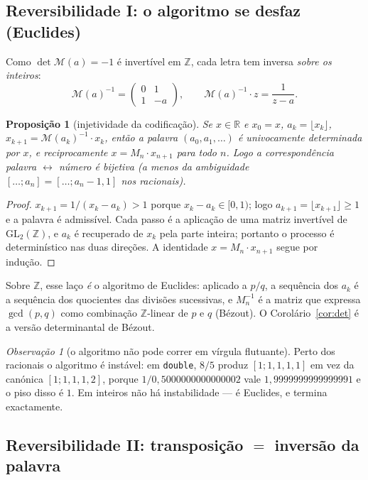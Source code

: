 \documentclass[11pt,a4paper]{article}
\theoremstyle{plain}
\newtheorem{proposicao}[teorema]{Proposição}
\theoremstyle{definition}
\theoremstyle{remark}
\newtheorem{obs}[teorema]{Observação}
\newcommand{\R}{\mathbb{R}}
\newcommand{\Z}{\mathbb{Z}}
\newcommand{\Mat}[1]{\mathcal{M}(#1)}
\newcommand{\GL}{\mathrm{GL}}
\newcommand{\cf}[2]{[#1;#2]}
\begin{document}
\subsection{Reversibilidade I: o algoritmo se desfaz (Euclides)}\label{sec:revI}

Como $\det\Mat{a} = -1$ é invertível em $\Z$, cada letra tem inversa \emph{sobre os inteiros}:
\[
  \Mat{a}^{-1} = \begin{pmatrix} 0 & 1 \\ 1 & -a \end{pmatrix},
  \qquad \Mat{a}^{-1}\cdot z = \frac{1}{z-a}.
\]

\begin{proposicao}[injetividade da codificação]
Se $x \in \R$ e $x_0 = x$, $a_k = \lfloor x_k \rfloor$, $x_{k+1} = \Mat{a_k}^{-1}\cdot x_k$,
então a palavra $(a_0,a_1,\dots)$ é univocamente determinada por $x$, e reciprocamente
$x = M_n \cdot x_{n+1}$ para todo $n$. Logo a correspondência palavra $\leftrightarrow$ número
é bijetiva (a menos da ambiguidade $\cf{\dots}{a_n} = \cf{\dots}{a_n-1,1}$ nos racionais).
\end{proposicao}

\begin{proof}
$x_{k+1} = 1/(x_k - a_k) > 1$ porque $x_k - a_k \in [0,1)$; logo $a_{k+1} = \lfloor x_{k+1}\rfloor
\geq 1$ e a palavra é admissível. Cada passo é a aplicação de uma matriz invertível de
$\GL_2(\Z)$, e $a_k$ é recuperado de $x_k$ pela parte inteira; portanto o processo é
determinístico nas duas direções. A identidade $x = M_n\cdot x_{n+1}$ segue por indução.
\end{proof}

Sobre $\Z$, esse laço \emph{é} o algoritmo de Euclides: aplicado a $p/q$, a sequência dos $a_k$
é a sequência dos quocientes das divisões sucessivas, e $M_n^{-1}$ é a matriz que expressa
$\gcd(p,q)$ como combinação $\Z$-linear de $p$ e $q$ (Bézout). O Corolário~\ref{cor:det} é
a versão determinantal de Bézout.

\begin{obs}[o algoritmo não pode correr em vírgula flutuante]\label{obs:float}
Perto dos racionais o algoritmo é instável: em \texttt{double}, $8/5$ produz $\cf{1}{1,1,1,1}$ em vez
da canónica $\cf{1}{1,1,1,2}$, porque $1/0{,}5000000000000002$ vale $1{,}9999999999999991$ e o piso
disso é $1$. Em inteiros não há instabilidade --- é Euclides, e termina exactamente.
\end{obs}

\subsection{Reversibilidade II: transposição \texorpdfstring{$=$}{=} inversão da palavra}\label{sec:revII}
\end{document}
